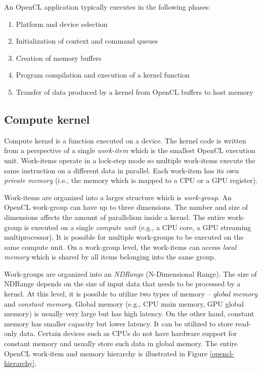 \documentclass[
  digital,     %
  oneside,     %
  nosansbold,  %
  nocolorbold, %
  lof,         %
  lot,         %
  nocover
]{fithesis4}
\begin{document}
An OpenCL application typically executes in the following phases:
\begin{enumerate}
    \item Platform and device selection
    \item Initialization of context and command queues
    \item Creation of memory buffers
    \item Program compilation and execution of a kernel function
    \item Transfer of data produced by a kernel from OpenCL buffers to host memory
\end{enumerate}

\subsection{Compute kernel}
\label{compute-kernel}
Compute kernel is a function executed on a device. The kernel code is written from a perspective of a single \textit{work-item} which is the smallest OpenCL execution unit. Work-items operate in a lock-step mode so multiple work-items execute the same instruction on a different data in parallel. Each work-item has its own \textit{private memory} (i.e., the memory which is mapped to a CPU or a GPU register).

Work-items are organized into a larger structure which is \textit{work-group}. An OpenCL work-group can have up to three dimensions. The number and size of dimensions affects the amount of parallelism inside a kernel. The entire work-group is executed on a single \textit{compute unit} (e.g., a CPU core, a GPU streaming multiprocessor). It is possible for multiple work-groups to be executed on the same compute unit. On a work-group level, the work-items can access \textit{local memory} which is shared by all items belonging into the same group.

Work-groups are organized into an \textit{NDRange} (N-Dimensional Range). The size of NDRange depends on the size of input data that needs to be processed by a kernel. At this level, it is possible to utilize two types of memory -- \textit{global memory} and \textit{constant memory}. Global memory (e.g., CPU main memory, GPU global memory) is usually very large but has high latency. On the other hand, constant memory has smaller capacity but lower latency. It can be utilized to store read-only data. Certain devices such as CPUs do not have hardware support for constant memory and usually store such data in global memory. The entire OpenCL work-item and memory hierarchy is illustrated in Figure \ref{opencl-hierarchy}.
\end{document}
